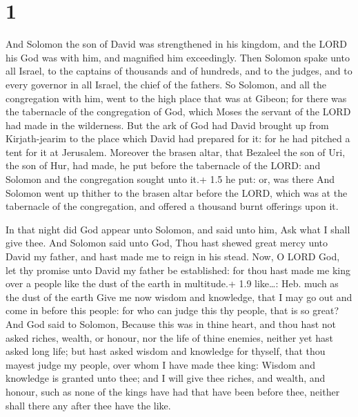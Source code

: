 \hypertarget{section}{%
\section{1}\label{section}}

 And Solomon the son of David was strengthened in his
kingdom, and the LORD his God was with him, and magnified him
exceedingly.  Then Solomon spake unto all Israel, to the
captains of thousands and of hundreds, and to the judges, and to every
governor in all Israel, the chief of the fathers.  So
Solomon, and all the congregation with him, went to the high place that
was at Gibeon; for there was the tabernacle of the congregation of God,
which Moses the servant of the LORD had made in the wilderness.
 But the ark of God had David brought up from Kirjath-jearim
to the place which David had prepared for it: for he had pitched a tent
for it at Jerusalem.  Moreover the brasen altar, that
Bezaleel the son of Uri, the son of Hur, had made, he put before the
tabernacle of the LORD: and Solomon and the congregation sought unto
it.+ 1.5 he put: or, was there  And Solomon went up thither
to the brasen altar before the LORD, which was at the tabernacle of the
congregation, and offered a thousand burnt offerings upon it.

 In that night did God appear unto Solomon, and said unto
him, Ask what I shall give thee.  And Solomon said unto God,
Thou hast shewed great mercy unto David my father, and hast made me to
reign in his stead.  Now, O LORD God, let thy promise unto
David my father be established: for thou hast made me king over a people
like the dust of the earth in multitude.+ 1.9 like\ldots: Heb. much as
the dust of the earth  Give me now wisdom and knowledge,
that I may go out and come in before this people: for who can judge this
thy people, that is so great?  And God said to Solomon,
Because this was in thine heart, and thou hast not asked riches, wealth,
or honour, nor the life of thine enemies, neither yet hast asked long
life; but hast asked wisdom and knowledge for thyself, that thou mayest
judge my people, over whom I have made thee king:  Wisdom
and knowledge is granted unto thee; and I will give thee riches, and
wealth, and honour, such as none of the kings have had that have been
before thee, neither shall there any after thee have the like.

